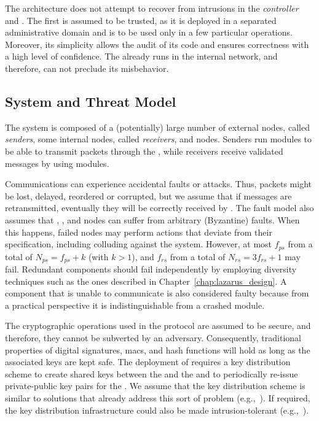 The \sieveq architecture does not attempt to recover from intrusions in the \emph{controller} and \postsieve.
The first is assumed to be trusted, as it is deployed in a separated administrative domain and is to be used only in a few particular operations.
Moreover, its simplicity allows the audit of its code and ensures correctness with a high level of confidence.
The \postsieve already runs in the internal network, and therefore, \sieveq can not preclude its misbehavior.



\subsection{System and Threat Model}
\label{fault_model}

The system is composed of a (potentially) large number of external nodes, called \emph{senders}, some internal nodes, called \emph{receivers}, and \sieveq nodes.
Senders run \sender modules to be able to transmit packets through the \sieveq, while receivers receive validated messages by using \postsieve modules. 

Communications can experience accidental faults or attacks.
Thus, packets might be lost, delayed, reordered or corrupted, but we assume that if messages are retransmitted, eventually they will be correctly received by \sieveq.
The fault model also assumes that \sender, \presieve, and \repsieve nodes can suffer from arbitrary (Byzantine) faults.
When this happens, failed nodes may perform actions that deviate from their specification, including colluding against the system.
However, at most $f_{ps}$ \presieves from a total of $N_{ps} = f_{ps} + k$ (with $k > 1$), and $f_{rs}$ \repsieve from a total of $N_{rs} = 3f_{rs}+1$ may fail.
Redundant components should fail independently by employing diversity techniques such as the ones described in Chapter~\ref{chap:lazarus_design}.
A component that is unable to communicate is also considered faulty because from a practical perspective it is indistinguishable from a crashed module.

The cryptographic operations used in the \sieveq protocol are assumed to be secure, and therefore, they cannot be subverted by an adversary. 
Consequently, traditional properties of digital signatures, \glspl{mac}, and hash functions will hold as long as the associated keys are kept safe.
The deployment of \sieveq requires a key distribution scheme to create shared keys between the \sender and the \presieve and to periodically re-issue private-public key pairs for the \sender.
We assume that the key distribution scheme is similar to solutions that already address this sort of problem (e.g.,~\cite{Harkins:1998}).
If required, the key distribution infrastructure could also be made intrusion-tolerant (e.g.,~\cite{Kreutz:2014,Zhou:2002}).


